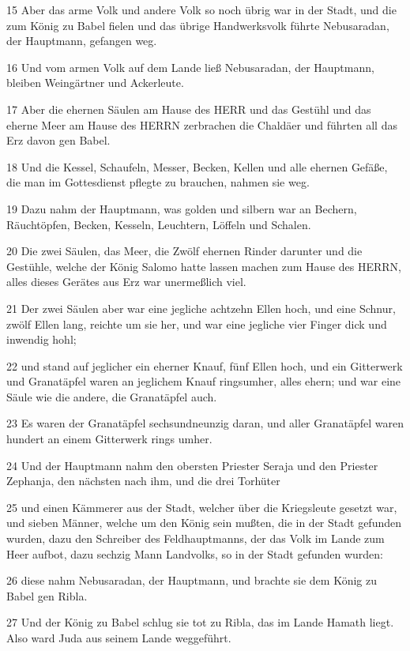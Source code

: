 \par 15 Aber das arme Volk und andere Volk so noch übrig war in der Stadt, und die zum König zu Babel fielen und das übrige Handwerksvolk führte Nebusaradan, der Hauptmann, gefangen weg.
\par 16 Und vom armen Volk auf dem Lande ließ Nebusaradan, der Hauptmann, bleiben Weingärtner und Ackerleute.
\par 17 Aber die ehernen Säulen am Hause des HERR und das Gestühl und das eherne Meer am Hause des HERRN zerbrachen die Chaldäer und führten all das Erz davon gen Babel.
\par 18 Und die Kessel, Schaufeln, Messer, Becken, Kellen und alle ehernen Gefäße, die man im Gottesdienst pflegte zu brauchen, nahmen sie weg.
\par 19 Dazu nahm der Hauptmann, was golden und silbern war an Bechern, Räuchtöpfen, Becken, Kesseln, Leuchtern, Löffeln und Schalen.
\par 20 Die zwei Säulen, das Meer, die Zwölf ehernen Rinder darunter und die Gestühle, welche der König Salomo hatte lassen machen zum Hause des HERRN, alles dieses Gerätes aus Erz war unermeßlich viel.
\par 21 Der zwei Säulen aber war eine jegliche achtzehn Ellen hoch, und eine Schnur, zwölf Ellen lang, reichte um sie her, und war eine jegliche vier Finger dick und inwendig hohl;
\par 22 und stand auf jeglicher ein eherner Knauf, fünf Ellen hoch, und ein Gitterwerk und Granatäpfel waren an jeglichem Knauf ringsumher, alles ehern; und war eine Säule wie die andere, die Granatäpfel auch.
\par 23 Es waren der Granatäpfel sechsundneunzig daran, und aller Granatäpfel waren hundert an einem Gitterwerk rings umher.
\par 24 Und der Hauptmann nahm den obersten Priester Seraja und den Priester Zephanja, den nächsten nach ihm, und die drei Torhüter
\par 25 und einen Kämmerer aus der Stadt, welcher über die Kriegsleute gesetzt war, und sieben Männer, welche um den König sein mußten, die in der Stadt gefunden wurden, dazu den Schreiber des Feldhauptmanns, der das Volk im Lande zum Heer aufbot, dazu sechzig Mann Landvolks, so in der Stadt gefunden wurden:
\par 26 diese nahm Nebusaradan, der Hauptmann, und brachte sie dem König zu Babel gen Ribla.
\par 27 Und der König zu Babel schlug sie tot zu Ribla, das im Lande Hamath liegt. Also ward Juda aus seinem Lande weggeführt.
